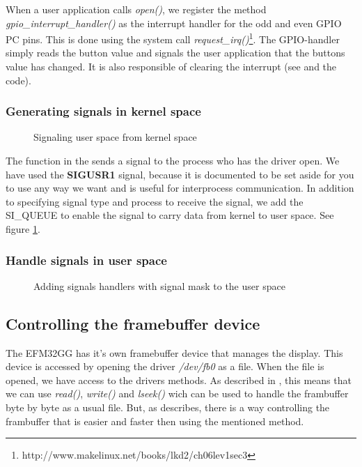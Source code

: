 When a user application calls \emph{open()}, we register the method \emph{gpio\_interrupt\_handler()} as the interrupt handler for the odd and even GPIO PC pins. This is done using the system call \emph{request\_irq()}\footnote{http://www.makelinux.net/books/lkd2/ch06lev1sec3}. The GPIO-handler simply reads the button value and signals the user application that the buttons value has changed. It is also responsible of clearing the interrupt (see \cite[section 3]{compendium} and the code).   

\subsubsection{Generating signals in kernel space}
\begin{figure}[h]
	\centering
	
	\caption{Signaling user space from kernel space}
	\label{fig:signal-user-application}
\end{figure}
The  function in the  sends a signal to the process who has the driver open. We have used the \textbf{SIGUSR1} signal, because it is documented to be set aside for you to use any way we want and is useful for interprocess communication. In addition to specifying signal type and process to receive the signal, we add the SI\_QUEUE to enable the signal to carry data from kernel to user space. See figure \ref{fig:signal-user-application}.

\subsubsection{Handle signals in user space}
\begin{figure}[h]
	\centering
	
	\caption{Adding signals handlers with signal mask to the user space}
	\label{fig:sighandler}
\end{figure}

\subsection{Controlling the framebuffer device}
The EFM32GG has it's own framebuffer device that manages the display. This device is accessed by opening the driver \emph{/dev/fb0} as a file. When the file is opened, we have access to the drivers methods. As described in \cite[section 5.4.2]{compendium}, this means that we can use \emph{read()}, \emph{write()} and \emph{lseek()} wich can be used to handle the frambuffer byte by byte as a usual file. But, as \cite[section 5.4.2]{compendium} describes, there is a way controlling the frambuffer that is easier and faster then using the mentioned method. \\

